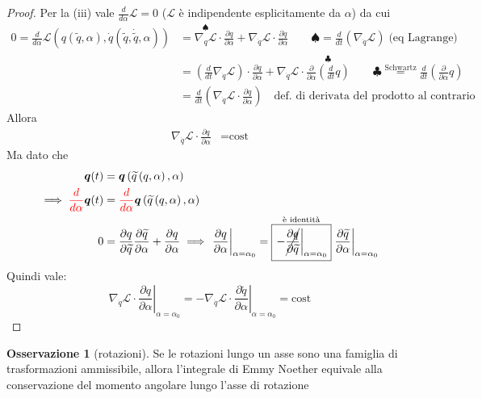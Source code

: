 \documentclass[a4paper,10pt]{article}
\theoremstyle{definition}
\newcommand{\bv}{\boldsymbol} %
\theoremstyle{indentdefinition}
\theoremstyle{indenttheorem}
\theoremstyle{myremark}
\newtheorem*{rem*}{Osservazione}
\theoremstyle{indentgeneral}
\begin{document}
\begin{proof}
Per la (iii) vale $\frac{d}{d\alpha}{\mathcal{L}}=0$ ($\mathcal{L}$ è indipendente esplicitamente da $\alpha$) da cui
\begin{align*}
0=\frac{d}{d\alpha}\mathcal{L}\left(q(\widetilde{q},\alpha),\dot{q}(\widetilde{q},\dot{\widetilde{q}},\alpha)\right)&=\overset{\spadesuit}{\boxed{\nabla_{q}\mathcal{L}}}\cdot\frac{\partial q}{\partial\alpha}+\nabla_{\dot{q}}\mathcal{L}\cdot\frac{\partial\dot{q}}{\partial\alpha} \quad\quad \spadesuit  =\frac{d}{dt}\left(\nabla_{\dot{q}}\mathcal{L}\right)\;\text{(eq Lagrange)}\\
&=\left(\frac{d}{dt}\nabla_{\dot{q}}\mathcal{L}\right)\cdot\frac{\partial q}{\partial\alpha}+\nabla_{\dot{q}}\mathcal{L}\cdot\overset{\clubsuit}{\boxed{\frac{\partial}{\partial\alpha}\left(\frac{d}{dt}q\right)}} \quad\quad \clubsuit  \overset{\text{Schwartz}}{=}\frac{d}{dt}\left(\frac{\partial}{\partial\alpha}q\right)\\
&=\frac{d}{dt}{\left({\nabla_{\dot{q}}\mathcal{L}\cdot\frac{\partial q}{\partial\alpha}}\right)} \quad\text{def. di derivata del prodotto al contrario}
\end{align*}
Allora
\begin{align*}
\nabla_{\dot{q}}\mathcal{L}\cdot\frac{\partial q}{\partial\alpha} & =\text{cost} 
\end{align*}
Ma dato che
\begin{align*}
    \bv{q}(t)&=\bv{q}\left(\widetilde{q}\left(q,\alpha\right),\alpha\right) \\
    \implies\textcolor{red}{\frac{d}{d\alpha}} \bv{q}(t)&= \textcolor{red}{\frac{d}{d\alpha}} \bv{q}\left(\widetilde{q}\left(q,\alpha\right),\alpha\right) \\
    0&=\frac{\partial q}{\partial\widetilde{q}}\frac{\partial\widetilde{q}}{\partial\alpha}+\frac{\partial q}{\partial\alpha}  \implies \left.\frac{\partial q}{\partial\alpha}\right|_{\alpha=\alpha_{0}}=\overset{\text{è identità}}{\boxed{\left.-\cancel{\frac{\partial q}{\partial\widetilde{q}}}\right|_{\alpha=\alpha_{0}}}}\left.\frac{\partial\widetilde{q}}{\partial\alpha}\right|_{\alpha=\alpha_{0}}
\end{align*}
Quindi vale:
$$\nabla_{\dot{q}}\mathcal{L}\cdot\boxed{\left.\frac{\partial q}{\partial\alpha}\right|_{\alpha=\alpha_{0}}}=-\nabla_{\dot{q}}\mathcal{L}\cdot\left.\frac{\partial\widetilde{q}}{\partial\alpha}\right|_{\alpha=\alpha_{0}}  =\text{cost}$$
\end{proof}
\begin{rem*}[rotazioni]
Se le rotazioni lungo un asse sono una famiglia di trasformazioni
ammissibile, allora l'integrale di Emmy Noether equivale alla conservazione
del momento angolare lungo l'asse di rotazione
\end{rem*}
\end{document}
